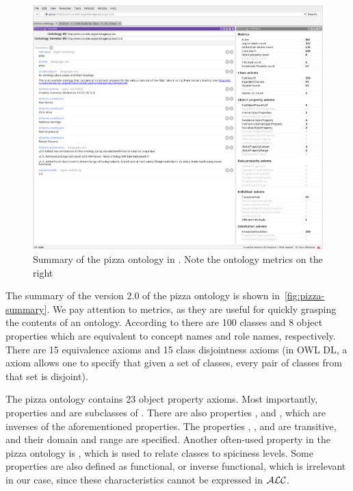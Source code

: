 \begin{figure}
\centering\includegraphics[width=\textwidth]{figures/pizza-summary.png}
\caption{Summary of the pizza ontology in \Protege. Note the ontology metrics on the right}
\label{fig:pizza-summary}
\end{figure}

The summary of the version 2.0 of the pizza ontology is shown in~\autoref{fig:pizza-summary}.
We pay attention to metrics, as they are useful for quickly grasping the contents of an ontology.
According to \Protege{} there are 100 classes and 8 object properties which are equivalent to concept names and role names, respectively.
There are 15 equivalence axioms and 15 class disjointness axioms (in OWL DL, a  axiom allows one to specify that given a set of classes, every pair of classes from that set is disjoint).

The pizza ontology contains 23 object property axioms.
Most importantly, properties  and  are subclasses of .
There are also properties ,  and , which are inverses of the aforementioned properties.
The properties , , and  are transitive, and their domain and range are specified.
Another often-used property in the pizza ontology is , which is used to relate classes to spiciness levels.
Some properties are also defined as functional, or inverse functional, which is irrelevant in our case, since these characteristics cannot be expressed in $\mathcal{ALC}$.

